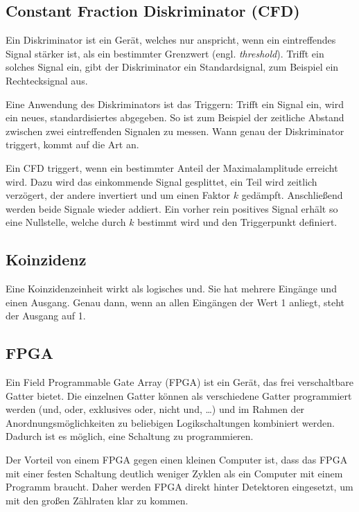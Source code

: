 \documentclass[11pt, ngerman, fleqn, DIV=15, headinclude, BCOR=2cm]{scrreprt}
\begin{document}
\subsection{Constant Fraction Diskriminator (CFD)}

Ein Diskriminator ist ein Gerät, welches nur anspricht, wenn ein eintreffendes
Signal stärker ist, als ein bestimmter Grenzwert (engl. \emph{threshold}).
Trifft ein solches Signal ein, gibt der Diskriminator ein Standardsignal, zum
Beispiel ein Rechtecksignal aus.

Eine Anwendung des Diskriminators ist das Triggern: Trifft ein Signal ein, wird
ein neues, standardisiertes abgegeben. So ist zum Beispiel der zeitliche
Abstand zwischen zwei eintreffenden Signalen zu messen. Wann genau der
Diskriminator triggert, kommt auf die Art an.

Ein CFD triggert, wenn ein bestimmter Anteil der Maximalamplitude erreicht
wird. Dazu wird das einkommende Signal gesplittet, ein Teil wird zeitlich
verzögert, der andere invertiert und um einen Faktor $k$ gedämpft. Anschließend
werden beide Signale wieder addiert. Ein vorher rein positives Signal erhält so
eine Nullstelle, welche durch $k$ bestimmt wird und den Triggerpunkt definiert.

\parencite{Ueding/525}

\subsection{Koinzidenz}

Eine Koinzidenzeinheit wirkt als logisches und. Sie hat mehrere Eingänge und
einen Ausgang. Genau dann, wenn an allen Eingängen der Wert 1 anliegt, steht
der Ausgang auf 1.

\subsection{FPGA}

Ein Field Programmable Gate Array (FPGA) ist ein Gerät, das frei verschaltbare
Gatter bietet. Die einzelnen Gatter können als verschiedene Gatter programmiert
werden (und, oder, exklusives oder, nicht und, …) und im Rahmen der
Anordnungsmöglichkeiten zu beliebigen Logikschaltungen kombiniert werden.
Dadurch ist es möglich, eine Schaltung zu programmieren.

Der Vorteil von einem FPGA gegen einen kleinen Computer ist, dass das FPGA mit
einer festen Schaltung deutlich weniger Zyklen als ein Computer mit einem
Programm braucht. Daher werden FPGA direkt hinter Detektoren eingesetzt, um mit
den großen Zählraten klar zu kommen.
\end{document}
